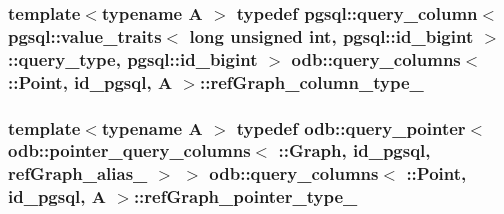 \subsubsection[{ref\+Graph\+\_\+column\+\_\+type\+\_\+}]{\setlength{\rightskip}{0pt plus 5cm}template$<$typename A $>$ typedef pgsql\+::query\+\_\+column$<$ pgsql\+::value\+\_\+traits$<$ long unsigned int, pgsql\+::id\+\_\+bigint $>$\+::query\+\_\+type, pgsql\+::id\+\_\+bigint $>$ odb\+::query\+\_\+columns$<$ \+::{\bf Point}, id\+\_\+pgsql, A $>$\+::{\bf ref\+Graph\+\_\+column\+\_\+type\+\_\+}}\label{structodb_1_1query__columns_3_01_1_1_point_00_01id__pgsql_00_01_a_01_4_a7990da27718c07e8f22372ebf2141b5c}
\hypertarget{structodb_1_1query__columns_3_01_1_1_point_00_01id__pgsql_00_01_a_01_4_a46cf54b02d697a2818e886261a4835a7}{}
\subsubsection[{ref\+Graph\+\_\+pointer\+\_\+type\+\_\+}]{\setlength{\rightskip}{0pt plus 5cm}template$<$typename A $>$ typedef odb\+::query\+\_\+pointer$<$ odb\+::pointer\+\_\+query\+\_\+columns$<$ \+::{\bf Graph}, id\+\_\+pgsql, {\bf ref\+Graph\+\_\+alias\+\_\+} $>$ $>$ odb\+::query\+\_\+columns$<$ \+::{\bf Point}, id\+\_\+pgsql, A $>$\+::{\bf ref\+Graph\+\_\+pointer\+\_\+type\+\_\+}}\label{structodb_1_1query__columns_3_01_1_1_point_00_01id__pgsql_00_01_a_01_4_a46cf54b02d697a2818e886261a4835a7}
\hypertarget{structodb_1_1query__columns_3_01_1_1_point_00_01id__pgsql_00_01_a_01_4_a6129668a657849ef92aad6ed6735262c}{}
